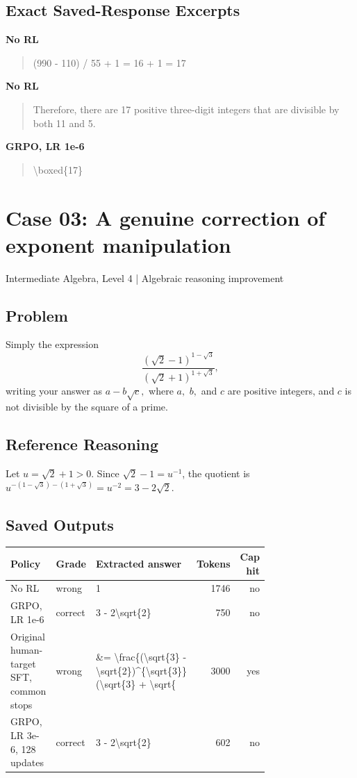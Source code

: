 \documentclass[10pt,letterpaper]{article}
\begin{document}
\subsection*{Exact Saved-Response Excerpts}
\textbf{No RL}
\begin{quote}\small\raggedright (990 - 110) / 55 + 1 = 16 + 1 = 17\end{quote}
\textbf{No RL}
\begin{quote}\small\raggedright Therefore, there are 17 positive three-digit integers that are divisible by both 11 and 5.\end{quote}
\textbf{GRPO, LR 1e-6}
\begin{quote}\small\raggedright \textbackslash{}boxed\{17\}\end{quote}
\clearpage\section*{Case 03: A genuine correction of exponent manipulation}
Intermediate Algebra, Level 4 | Algebraic reasoning improvement
\subsection*{Problem}
Simply the expression
\[\frac{(\sqrt{2} - 1)^{1 - \sqrt{3}}}{(\sqrt{2} + 1)^{1 + \sqrt{3}}},\]writing your answer as $a - b \sqrt{c},$ where $a,$ $b,$ and $c$ are positive integers, and $c$ is not divisible by the square of a prime.
\subsection*{Reference Reasoning}
Let $u=\sqrt{2}+1>0$. Since $\sqrt{2}-1=u^{-1}$, the quotient is $u^{-(1-\sqrt{3})-(1+\sqrt{3})}=u^{-2}=3-2\sqrt{2}$.
\subsection*{Saved Outputs}
\small\begin{longtable}{p{0.29\linewidth}p{0.10\linewidth}p{0.35\linewidth}rr}\toprule Policy & Grade & Extracted answer & Tokens & Cap hit\\\midrule
No RL & wrong & 1 & 1746 & no\\
GRPO, LR 1e-6 & correct & 3 - 2\textbackslash{}sqrt\{2\} & 750 & no\\
Original human-target SFT, common stops & wrong & \&= \textbackslash{}frac\{(\textbackslash{}sqrt\{3\} - \textbackslash{}sqrt\{2\})\textasciicircum{}\{\textbackslash{}sqrt\{3\}\} (\textbackslash{}sqrt\{3\} + \textbackslash{}sqrt\{ & 3000 & yes\\
GRPO, LR 3e-6, 128 updates & correct & 3 - 2\textbackslash{}sqrt\{2\} & 602 & no\\
\bottomrule\end{longtable}\normalsize
\end{document}
